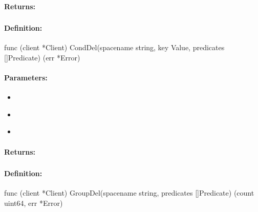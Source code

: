 \paragraph{Returns:}


\pagebreak
\subsubsection{}
\label{api:Go:CondDel}


\paragraph{Definition:}
\begin{gocode}
func (client *Client) CondDel(spacename string, key Value, predicates []Predicate) (err *Error)
\end{gocode}

\paragraph{Parameters:}
\begin{itemize}[noitemsep]
\item {}\\

\item {}\\

\item {}\\

\end{itemize}

\paragraph{Returns:}


\pagebreak
\subsubsection{}
\label{api:Go:GroupDel}


\paragraph{Definition:}
\begin{gocode}
func (client *Client) GroupDel(spacename string, predicates []Predicate) (count uint64, err *Error)
\end{gocode}

